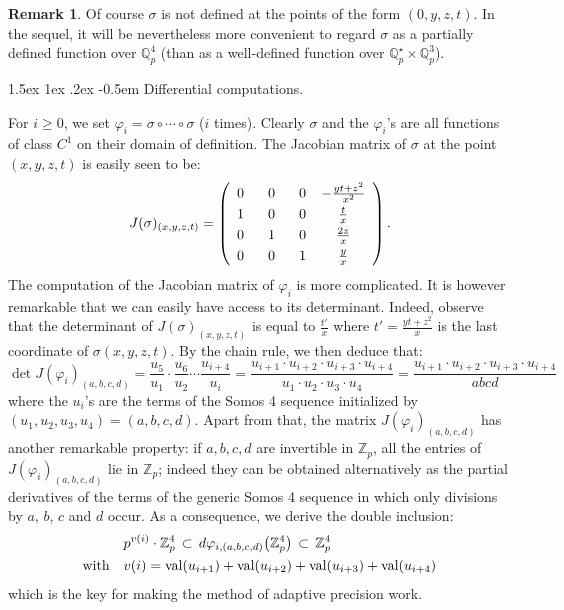 \documentclass[11pt]{article}
\makeatletter
\numberwithin{equation}{section}
\numberwithin{figure}{section}
\renewcommand\subparagraph{\@startsection{subparagraph}{5}{\z@}%
                                       {1.5ex \@plus1ex \@minus .2ex}%
                                       {-0.5em}%
                                      {\normalfont\normalsize\it}}
\renewcommand{\geq}{\geqslant}
\theoremstyle{definition}
\newtheorem{rem}[theo]{Remark}
\newcommand{\Z}{\mathbb Z}
\newcommand{\Zp}{\Z_p}
\newcommand{\Q}{\mathbb Q}
\newcommand{\Qp}{\Q_p}
\newcommand{\val}{\text{\rm val}}
\makeatother
\begin{document}
\begin{rem}
Of course $\sigma$ is not defined at the points of the form $(0,y,z,t)$. 
In the sequel, it will be nevertheless more convenient to regard 
$\sigma$ as a partially defined function over $\Qp^4$ (than as a 
well-defined function over $\Qp^\star \times \Qp^3$).
\end{rem}

\subparagraph{Differential computations.}

For $i \geq 0$, we set $\varphi_i = \sigma \circ \cdots \circ \sigma$
($i$ times). Clearly $\sigma$ and the $\varphi_i$'s are all functions
of class $C^1$ on their domain of definition. The Jacobian matrix of 
$\sigma$ at the point $(x,y,z,t)$ is easily seen to be:
$$J(\sigma)_{(x,y,z,t)} = 
\left( \begin{array}{c@{\hspace{4ex}}c@{\hspace{4ex}}c@{\hspace{2.5ex}}c}
0 & 0 & 0 & -\frac{yt+z^2}{x^2} \smallskip \\
1 & 0 & 0 & \frac t x \smallskip \\
0 & 1 & 0 & \frac{2z} x \smallskip \\
0 & 0 & 1 & \frac y x 
\end{array} \right).$$
The computation of the Jacobian matrix of $\varphi_i$ is more 
complicated. It is however remarkable that we can easily have access to 
its determinant. Indeed, observe that the determinant of $J(\sigma) 
_{(x,y,z,t)}$ is equal to $\frac {t'} x$ where $t' = \frac{yt+z^2}x$ is 
the last coordinate of $\sigma(x,y,z,t)$. By the chain rule, we then
deduce that:
\begin{equation}
\label{eq:detjacsomos}
\det J(\varphi_i)_{(a,b,c,d)} = 
\frac{u_5}{u_1} \cdot \frac {u_6}{u_2} \cdots \frac{u_{i+4}}{u_i} =
\frac{u_{i+1} \cdot u_{i+2} \cdot u_{i+3} \cdot u_{i+4}}{u_1 \cdot u_2 \cdot u_3 \cdot u_4} =
\frac{u_{i+1} \cdot u_{i+2} \cdot u_{i+3} \cdot u_{i+4}}{abcd}
\end{equation}
where the $u_i$'s are the terms of the Somos 4 sequence initialized 
by $(u_1, u_2, u_3, u_4) = (a,b,c,d)$.
Apart from that, the matrix $J(\varphi_i)_{(a,b,c,d)}$ has another 
remarkable property: if $a,b,c,d$ are invertible in $\Zp$, all the 
entries of $J(\varphi_i)_{(a,b,c,d)}$ lie in $\Zp$; indeed they can
be obtained alternatively as the partial derivatives of the terms of 
the generic Somos 4 sequence in which only divisions by $a$, $b$,
$c$ and $d$ occur. As a consequence, we derive the double inclusion:
\begin{align}
\label{eq:latticesomos}
& p^{v(i)} \cdot \Zp^4 \, \subset \, 
  d \varphi_{i,(a,b,c,d)}\big(\Zp^4\big) \, \subset \, \Zp^4\\
\text{with} \quad &
  v(i) = \val(u_{i+1}) + \val(u_{i+2}) + \val(u_{i+3}) + \val(u_{i+4})
\nonumber
\end{align}
which is the key for making the method of adaptive precision work.
\end{document}
